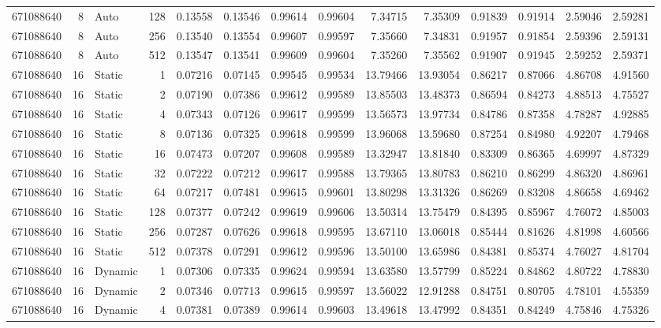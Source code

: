 \begin{tabular}{rrlrrrrrrrrrrr}
671088640 & 8 & Auto & 128 & 0.13558 & 0.13546 & 0.99614 & 0.99604 & 7.34715 & 7.35309 & 0.91839 & 0.91914 & 2.59046 & 2.59281 \\
671088640 & 8 & Auto & 256 & 0.13540 & 0.13554 & 0.99607 & 0.99597 & 7.35660 & 7.34831 & 0.91957 & 0.91854 & 2.59396 & 2.59131 \\
671088640 & 8 & Auto & 512 & 0.13547 & 0.13541 & 0.99609 & 0.99604 & 7.35260 & 7.35562 & 0.91907 & 0.91945 & 2.59252 & 2.59371 \\
671088640 & 16 & Static & 1 & 0.07216 & 0.07145 & 0.99545 & 0.99534 & 13.79466 & 13.93054 & 0.86217 & 0.87066 & 4.86708 & 4.91560 \\
671088640 & 16 & Static & 2 & 0.07190 & 0.07386 & 0.99612 & 0.99589 & 13.85503 & 13.48373 & 0.86594 & 0.84273 & 4.88513 & 4.75527 \\
671088640 & 16 & Static & 4 & 0.07343 & 0.07126 & 0.99617 & 0.99599 & 13.56573 & 13.97734 & 0.84786 & 0.87358 & 4.78287 & 4.92885 \\
671088640 & 16 & Static & 8 & 0.07136 & 0.07325 & 0.99618 & 0.99599 & 13.96068 & 13.59680 & 0.87254 & 0.84980 & 4.92207 & 4.79468 \\
671088640 & 16 & Static & 16 & 0.07473 & 0.07207 & 0.99608 & 0.99589 & 13.32947 & 13.81840 & 0.83309 & 0.86365 & 4.69997 & 4.87329 \\
671088640 & 16 & Static & 32 & 0.07222 & 0.07212 & 0.99617 & 0.99588 & 13.79365 & 13.80783 & 0.86210 & 0.86299 & 4.86320 & 4.86961 \\
671088640 & 16 & Static & 64 & 0.07217 & 0.07481 & 0.99615 & 0.99601 & 13.80298 & 13.31326 & 0.86269 & 0.83208 & 4.86658 & 4.69462 \\
671088640 & 16 & Static & 128 & 0.07377 & 0.07242 & 0.99619 & 0.99606 & 13.50314 & 13.75479 & 0.84395 & 0.85967 & 4.76072 & 4.85003 \\
671088640 & 16 & Static & 256 & 0.07287 & 0.07626 & 0.99618 & 0.99595 & 13.67110 & 13.06018 & 0.85444 & 0.81626 & 4.81998 & 4.60566 \\
671088640 & 16 & Static & 512 & 0.07378 & 0.07291 & 0.99612 & 0.99596 & 13.50100 & 13.65986 & 0.84381 & 0.85374 & 4.76027 & 4.81704 \\
671088640 & 16 & Dynamic & 1 & 0.07306 & 0.07335 & 0.99624 & 0.99594 & 13.63580 & 13.57799 & 0.85224 & 0.84862 & 4.80722 & 4.78830 \\
671088640 & 16 & Dynamic & 2 & 0.07346 & 0.07713 & 0.99615 & 0.99597 & 13.56022 & 12.91288 & 0.84751 & 0.80705 & 4.78101 & 4.55359 \\
671088640 & 16 & Dynamic & 4 & 0.07381 & 0.07389 & 0.99614 & 0.99603 & 13.49618 & 13.47992 & 0.84351 & 0.84249 & 4.75846 & 4.75326 \\

\end{tabular}
